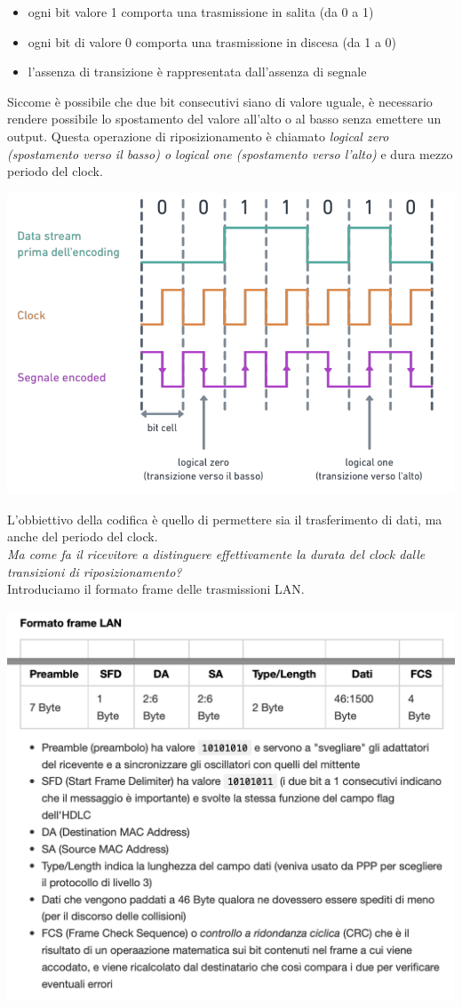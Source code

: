 \documentclass[11pt, oneside]{article}   	%
\begin{document}
\begin{itemize}
\item ogni bit valore 1 comporta una trasmissione in salita (da 0 a 1)
\item ogni bit di valore 0 comporta una trasmissione in discesa (da 1 a 0)
\item l'assenza di transizione è rappresentata dall'assenza di segnale
\end{itemize}
Siccome è possibile che due bit consecutivi siano di valore uguale, è necessario rendere possibile lo spostamento del valore all'alto o al basso senza emettere un output. Questa operazione di riposizionamento è chiamato \emph{logical zero (spostamento verso il basso) o logical one (spostamento verso l'alto)} e dura mezzo periodo del clock.
\begin{center}
\includegraphics[scale=0.5]{manch}
\end{center}
L'obbiettivo della codifica è quello di permettere sia il trasferimento di dati, ma anche del periodo del clock. \\\emph{Ma come fa il ricevitore a distinguere effettivamente la durata del clock dalle transizioni di riposizionamento?}\\
Introduciamo il formato frame delle trasmissioni LAN.
\begin{center}
\includegraphics[scale=0.5]{format}
\end{center}
\end{document}
